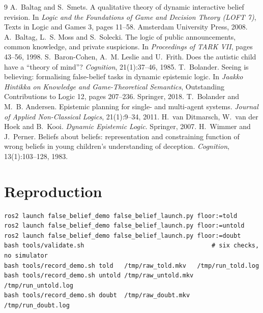 \documentclass[11pt,a4paper]{article}
\theoremstyle{definition}
\begin{document}
\begin{thebibliography}{9}
 A.~Baltag and S.~Smets.
  A qualitative theory of dynamic interactive belief revision.
  In \emph{Logic and the Foundations of Game and Decision Theory (LOFT 7)},
  Texts in Logic and Games 3, pages 11--58. Amsterdam University Press, 2008.
 A.~Baltag, L.~S. Moss and S.~Solecki.
  The logic of public announcements, common knowledge, and private suspicions.
  In \emph{Proceedings of TARK VII}, pages 43--56, 1998.
 S.~Baron-Cohen, A.~M. Leslie and U.~Frith.
  Does the autistic child have a ``theory of mind''?
  \emph{Cognition}, 21(1):37--46, 1985.
 T.~Bolander.
  Seeing is believing: formalising false-belief tasks in dynamic epistemic logic.
  In \emph{Jaakko Hintikka on Knowledge and Game-Theoretical Semantics},
  Outstanding Contributions to Logic 12, pages 207--236. Springer, 2018.
 T.~Bolander and M.~B. Andersen.
  Epistemic planning for single- and multi-agent systems.
  \emph{Journal of Applied Non-Classical Logics}, 21(1):9--34, 2011.
 H.~van Ditmarsch, W.~van der Hoek and B.~Kooi.
  \emph{Dynamic Epistemic Logic}. Springer, 2007.
 H.~Wimmer and J.~Perner.
  Beliefs about beliefs: representation and constraining function of wrong
  beliefs in young children's understanding of deception.
  \emph{Cognition}, 13(1):103--128, 1983.
\end{thebibliography}

\section*{Reproduction}

\begin{lstlisting}
ros2 launch false_belief_demo false_belief_launch.py floor:=told
ros2 launch false_belief_demo false_belief_launch.py floor:=untold
ros2 launch false_belief_demo false_belief_launch.py floor:=doubt
bash tools/validate.sh                                   # six checks, no simulator
bash tools/record_demo.sh told   /tmp/raw_told.mkv   /tmp/run_told.log
bash tools/record_demo.sh untold /tmp/raw_untold.mkv /tmp/run_untold.log
bash tools/record_demo.sh doubt  /tmp/raw_doubt.mkv  /tmp/run_doubt.log
\end{lstlisting}
\end{document}
